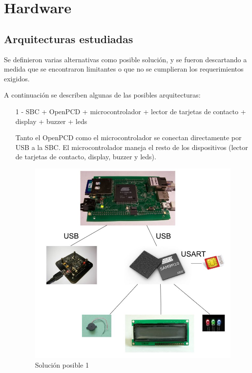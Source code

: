 \chapter{Hardware}

\section{Arquitecturas estudiadas}
Se definieron varias alternativas como posible solución, y se fueron descartando a medida que se encontraron limitantes o que no se cumplieran los requerimientos exigidos.

A continuación se describen algunas de las posibles arquitecturas:

\begin{itemize}
\item[1 -] SBC + OpenPCD + microcontrolador + lector de tarjetas de contacto + display + buzzer + leds
\bigskip

Tanto el OpenPCD como el microcontrolador se conectan directamente por USB a la SBC. El microcontrolador maneja el resto de los dispositivos (lector de tarjetas de contacto, display, buzzer y leds).

\begin{figure}[H]
\centering
  \begin{center}
  \includegraphics[scale=.25]{Imagenes/1.jpg} 
  \end{center}
  \caption{Solución posible 1}\label{Fig:HW} 
\end{figure}


\end{itemize}
